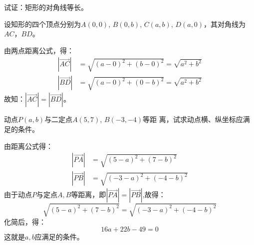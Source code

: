 \begin{example}
    试证：矩形的对角线等长。
\end{example}

\begin{solution}
设知形的四个顶点分别为$A(0,0)$, $B(0,b)$, $C(a,b)$, $D(a,0)$，其对角线为$AC$，$BD$。

由两点距离公式，得：
\[\begin{split}
    |\Vec{AC}|&=\sqrt{(a-0)^2+(b-0)^2}=\sqrt{a^2+b^2}\\
|\Vec{BD}|&=\sqrt{(a-0)^2+(0-b)^2}=\sqrt{a^2+b^2}
\end{split}\]
故知：$|\Vec{AC}|=|\Vec{BD}|$。
\end{solution}

\begin{example}
    动点$P(a,b)$与二定点$A(5,7)$, $B(-3,-4)$等距
离，试求动点横、纵坐标应满足的条件。
\end{example}


\begin{solution}
    由距离公式得：
\[\begin{split}
    |\Vec{PA}|&=\sqrt{(5-a)^2+(7-b)^2}\\
    |\Vec{PB}|&=\sqrt{(-3-a)^2+(-4-b)^2}
\end{split}\]
由于动点$P$与定点$A,B$等距离，即$|\Vec{PA}|=|\Vec{PB}|$,故得：
\[\sqrt{(5-a)^2+(7-b)^2}=\sqrt{(-3-a)^2+(-4-b)^2}\]
化简后，得：
\[16a+22b-49=0\]
这就是$a,b$应满足的条件。
\end{solution}

